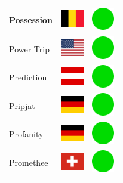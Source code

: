 \documentclass[12pt, a4paper, twoside]{report}
\begin{document}
\begin{center}
\begin{longtable}{|p{5cm}|p{2cm}|p{2cm}|}
Possession & \includegraphics[width=1cm]{4x3/be} & \includegraphics[width=1cm]{likes/y} \\ \hline
Power Trip & \includegraphics[width=1cm]{4x3/us} & \includegraphics[width=1cm]{likes/y} \\ \hline
Prediction & \includegraphics[width=1cm]{4x3/at} & \includegraphics[width=1cm]{likes/y} \\ \hline
Pripjat & \includegraphics[width=1cm]{4x3/de} & \includegraphics[width=1cm]{likes/y} \\ \hline
Profanity & \includegraphics[width=1cm]{4x3/de} & \includegraphics[width=1cm]{likes/y} \\ \hline
Promethee & \includegraphics[width=1cm]{4x3/ch} & \includegraphics[width=1cm]{likes/y} \\ \hline

\end{longtable}
\end{center}
\end{document}
